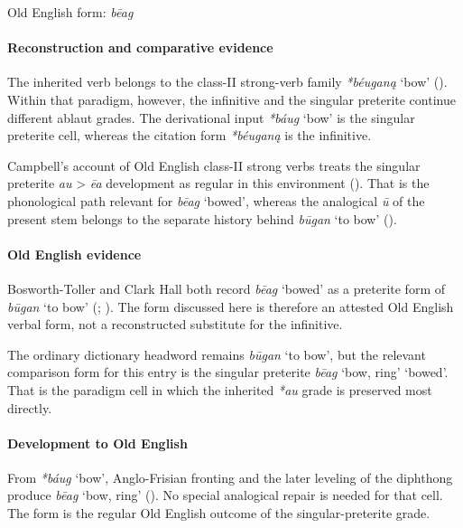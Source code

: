 \documentclass[
  british,
  a4paper,
]{article}
\providecommand{\Recon}[1]{\emph{*#1}}
\begin{document}
Old English form: \emph{bēag}

\paragraph{Reconstruction and comparative
evidence}\label{reconstruction-and-comparative-evidence-128}

The inherited verb belongs to the class-II strong-verb family
\Recon{béuganą} `bow' (). Within that paradigm, however, the infinitive and the
singular preterite continue different ablaut grades. The derivational
input \Recon{báug} `bow' is the singular preterite cell, whereas the
citation form \Recon{béuganą} is the infinitive.

Campbell's account of Old English class-II strong verbs treats the
singular preterite \emph{au} \textgreater{} \emph{ēa} development as
regular in this environment (). That is the phonological path relevant for {\emph{bēag}} `bowed',
whereas the analogical \emph{ū} of the present stem belongs to the
separate history behind {\emph{būgan}} `to bow'
().

\paragraph{Old English evidence}\label{old-english-evidence-130}

Bosworth-Toller and Clark Hall both record {\emph{bēag}} `bowed' as a
preterite form of {\emph{būgan}} `to bow'
(;
). The form discussed
here is therefore an attested Old English verbal form, not a
reconstructed substitute for the infinitive.

The ordinary dictionary headword remains {\emph{būgan}} `to bow', but
the relevant comparison form for this entry is the singular preterite
{\emph{bēag}} `bow, ring' `bowed'. That is the paradigm cell in which
the inherited \emph{*au} grade is preserved most directly.

\paragraph{Development to Old
English}\label{development-to-old-english-128}

From \Recon{báug} `bow', Anglo-Frisian fronting and the later leveling
of the diphthong produce {\emph{bēag}} `bow, ring'
(). No special analogical
repair is needed for that cell. The form is the regular Old English
outcome of the singular-preterite grade.
\end{document}
